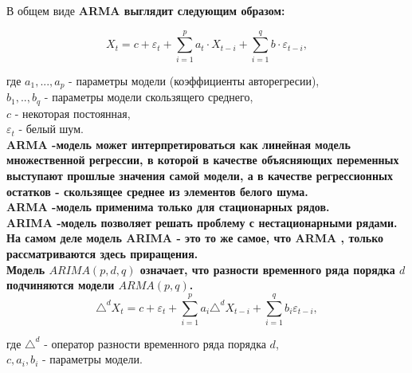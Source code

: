 \documentclass[12pt,a4paper]{paper}
\begin{document}
В общем виде \bfseries{ARMA} \mdseries выглядит следующим образом:

$$X_t=c+\varepsilon_{t}+\sum_{i=1}^{p}a_t \cdot X_{t-i}+\sum_{i=1}^{q}b \cdot \varepsilon_{t-i},$$

где $a_1,..., a_p$ - параметры модели (коэффициенты авторегресии),\\ 

$b_1, .., b_q$ -  параметры модели скользящего среднего,\\ 

$c$ - некоторая постоянная, \\

$\varepsilon_{t}$ - белый шум. \\

\bfseries{ARMA} \mdseries-модель может интерпретироваться как линейная модель множественной регрессии, в которой в качестве объясняющих переменных выступают прошлые значения самой модели, а в качестве регрессионных остатков - скользящее среднее из элементов белого шума. \\

\bfseries{ARMA} \mdseries-модель применима только для стационарных рядов.\\

\bfseries{ARIMA} \mdseries-модель позволяет решать проблему с нестационарными рядами.\\

На самом деле модель \bfseries{ARIMA} \mdseries - это то же самое, что \bfseries{ARMA} \mdseries, только рассматриваются здесь приращения.\\

Модель $ARIMA(p,d,q)$ означает, что разности временного ряда порядка $d$ подчиняются модели $ARMA(p,q)$.\\

$$\triangle^d X_t=c+\varepsilon_{t}+\sum_{i=1}^{p}a_i\triangle^d X_{t-i}+\sum_{i=1}^{q}b_i\varepsilon_{t-i},$$ 

где $\triangle^d$ - оператор разности временного ряда порядка $d$,\\

$c, a_i, b_i$ - параметры модели.\\
\end{document}
